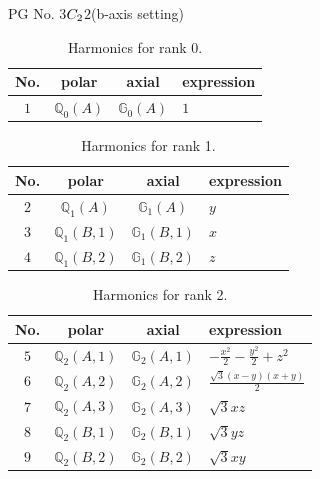\documentclass[fleqn,8pt,landscape]{jsarticle}
\begin{document}
\setcounter{MaxMatrixCols}{32}

\renewcommand{\tablename}{Table~}
\renewcommand{\figurename}{Figure~}
\begin{center}
\LARGE
PG No. 3\quad$C_{\rm 2}$\quad$2$\quad(b-axis setting)\quad[ monoclinic ]
\end{center}
\begin{table}[ht!]
\begin{center}
\caption{Harmonics for rank 0.}
\renewcommand{\arraystretch}{1.3}
\begin{tabular}{cccl} \hline \hline
No. & polar & axial & expression \\ \hline
$ 1 $ & $ \mathbb{Q}_{0}(A) $ & $ \mathbb{G}_{0}(A) $ & $ 1 $ \\
 \hline \hline
\end{tabular}
\end{center}
\end{table}
\begin{table}[ht!]
\begin{center}
\caption{Harmonics for rank 1.}
\renewcommand{\arraystretch}{1.3}
\begin{tabular}{cccl} \hline \hline
No. & polar & axial & expression \\ \hline
$ 2 $ & $ \mathbb{Q}_{1}(A) $ & $ \mathbb{G}_{1}(A) $ & $ y $ \\
$ 3 $ & $ \mathbb{Q}_{1}(B,1) $ & $ \mathbb{G}_{1}(B,1) $ & $ x $ \\
$ 4 $ & $ \mathbb{Q}_{1}(B,2) $ & $ \mathbb{G}_{1}(B,2) $ & $ z $ \\
 \hline \hline
\end{tabular}
\end{center}
\end{table}
\begin{table}[ht!]
\begin{center}
\caption{Harmonics for rank 2.}
\renewcommand{\arraystretch}{1.3}
\begin{tabular}{cccl} \hline \hline
No. & polar & axial & expression \\ \hline
$ 5 $ & $ \mathbb{Q}_{2}(A,1) $ & $ \mathbb{G}_{2}(A,1) $ & $ - \frac{x^{2}}{2} - \frac{y^{2}}{2} + z^{2} $ \\
$ 6 $ & $ \mathbb{Q}_{2}(A,2) $ & $ \mathbb{G}_{2}(A,2) $ & $ \frac{\sqrt{3} \left(x - y\right) \left(x + y\right)}{2} $ \\
$ 7 $ & $ \mathbb{Q}_{2}(A,3) $ & $ \mathbb{G}_{2}(A,3) $ & $ \sqrt{3} x z $ \\
$ 8 $ & $ \mathbb{Q}_{2}(B,1) $ & $ \mathbb{G}_{2}(B,1) $ & $ \sqrt{3} y z $ \\
$ 9 $ & $ \mathbb{Q}_{2}(B,2) $ & $ \mathbb{G}_{2}(B,2) $ & $ \sqrt{3} x y $ \\
 \hline \hline
\end{tabular}
\end{center}
\end{table}
\end{document}
